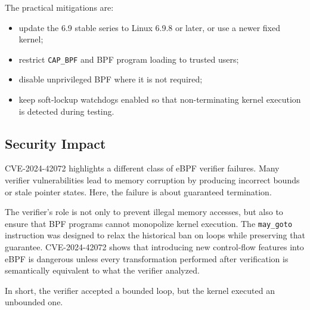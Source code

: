 \documentclass[../main.tex]{subfiles}
\begin{document}
The practical mitigations are:

\begin{itemize}
    \item update the 6.9 stable series to Linux 6.9.8 or later, or use a newer fixed kernel;
    \item restrict \texttt{CAP\_BPF} and BPF program loading to trusted users;
    \item disable unprivileged BPF where it is not required;
    \item keep soft-lockup watchdogs enabled so that non-terminating kernel execution is detected during testing.
\end{itemize}

\subsection{Security Impact}

CVE-2024-42072 highlights a different class of eBPF verifier failures. Many verifier vulnerabilities lead to memory corruption by producing incorrect bounds or stale pointer states. Here, the failure is about guaranteed termination.

The verifier's role is not only to prevent illegal memory accesses, but also to ensure that BPF programs cannot monopolize kernel execution. The \texttt{may\_goto} instruction was designed to relax the historical ban on loops while preserving that guarantee. CVE-2024-42072 shows that introducing new control-flow features into eBPF is dangerous unless every transformation performed after verification is semantically equivalent to what the verifier analyzed.

In short, the verifier accepted a bounded loop, but the kernel executed an unbounded one.
\end{document}
